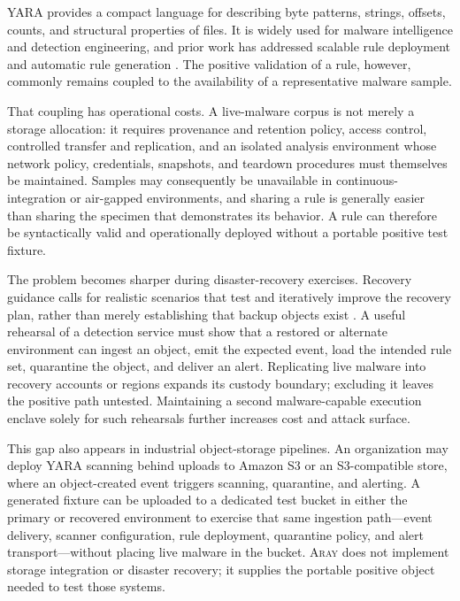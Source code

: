 \documentclass[11pt,twocolumn]{article}
\newcommand{\tool}{\textsc{Aray}\xspace}
\begin{document}
YARA provides a compact language for describing byte patterns, strings,
offsets, counts, and structural properties of files. It is widely used for
malware intelligence and detection engineering, and prior work has addressed
scalable rule deployment and automatic rule generation
\cite{yaradocs,brengel2021yarix,raff2020autoyara,li2023packgenome,mansour2025neuroyara,coscia2025apiary}.
The positive validation of a rule, however, commonly remains coupled to the
availability of a representative malware sample.

That coupling has operational costs. A live-malware corpus is not merely a
storage allocation: it requires provenance and retention policy, access control,
controlled transfer and replication, and an isolated analysis environment whose
network policy, credentials, snapshots, and teardown procedures must themselves
be maintained. Samples may consequently be unavailable in continuous-integration
or air-gapped environments, and sharing a rule is generally easier than sharing
the specimen that demonstrates its behavior. A rule can therefore be
syntactically valid and operationally deployed without a portable positive test
fixture.

The problem becomes sharper during disaster-recovery exercises. Recovery
guidance calls for realistic scenarios that test and iteratively improve the
recovery plan, rather than merely establishing that backup objects exist
\cite{bartock2016recovery}. A useful rehearsal of a detection service must show
that a restored or alternate environment can ingest an object, emit the expected
event, load the intended rule set, quarantine the object, and deliver an alert.
Replicating live malware into recovery accounts or regions expands its custody
boundary; excluding it leaves the positive path untested. Maintaining a second
malware-capable execution enclave solely for such rehearsals further increases
cost and attack surface.

This gap also appears in industrial object-storage pipelines. An organization
may deploy YARA scanning behind uploads to Amazon S3 or an S3-compatible store,
where an object-created event triggers scanning, quarantine, and alerting. A
generated fixture can be uploaded to a dedicated test bucket in either the
primary or recovered environment to exercise that same ingestion path---event
delivery, scanner configuration, rule deployment, quarantine policy, and alert
transport---without placing live malware in the bucket. \tool does not implement
storage integration or disaster recovery; it supplies the portable positive
object needed to test those systems.
\end{document}
